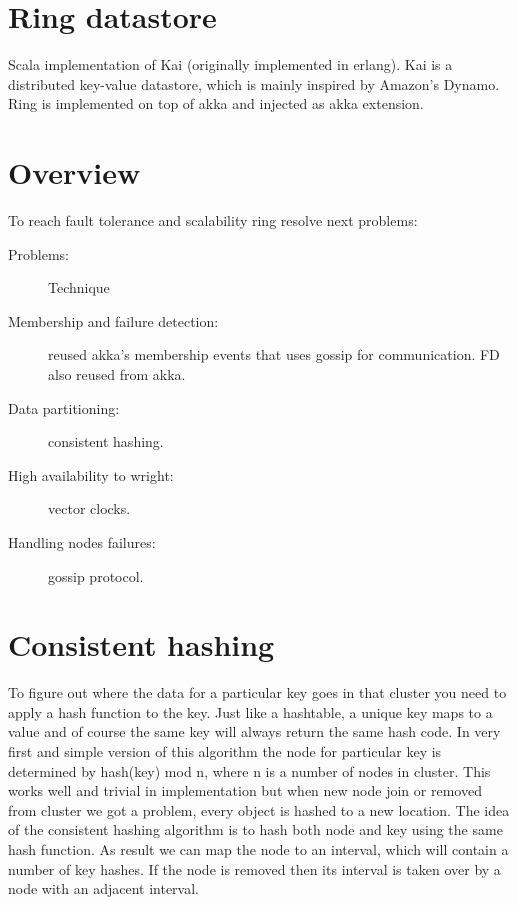 \section{Ring datastore}

Scala implementation of Kai (originally implemented in erlang).
Kai is a distributed key-value datastore, which is mainly inspired
by Amazon's Dynamo. Ring is implemented on top of akka and injected as akka extension.

\section*{Overview}

To reach fault tolerance and scalability ring resolve next problems:

\begin{description}

          \item[Problems:]  Technique
          \item[Membership and failure detection: ]  reused akka's membership events that uses gossip for communication. FD also reused from akka.
          \item[Data partitioning:]   consistent hashing.
          \item[High availability to wright:]   vector clocks.
          \item[Handling nodes failures:] gossip protocol.

\end{description}

\section*{Consistent hashing}

To figure out where the data for a particular key goes in that cluster you need to apply a hash function to the key.
Just like a hashtable, a unique key maps to a value and of course the same key will always return the same hash code.
In very first and simple version of this algorithm the node for particular key is determined by hash(key) mod n, where n is a number of
nodes in cluster. This works well and trivial in implementation but when new node join or removed from cluster we got a problem, every object is hashed to a new location.
The idea of the consistent hashing algorithm is to hash both node and key using the same hash function.
As result we can map the node to an interval, which will contain a number of key hashes. If the node is removed
then its interval is taken over by a node with an adjacent interval.

